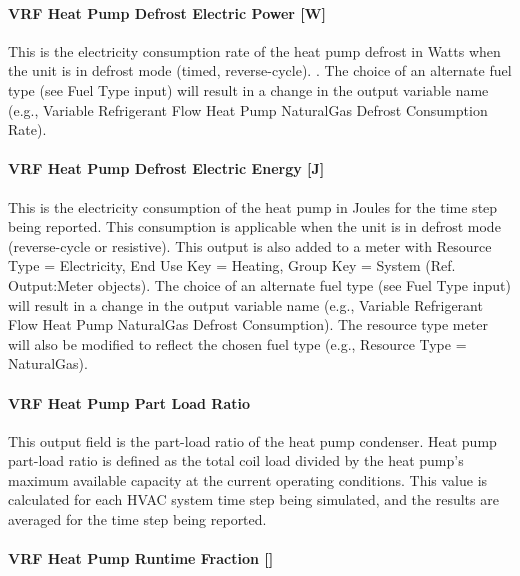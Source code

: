\paragraph{VRF Heat Pump Defrost Electric Power {[}W{]}}\label{vrf-heat-pump-defrost-electric-power-w}

This is the electricity consumption rate of the heat pump defrost in Watts when the unit is in defrost mode (timed, reverse-cycle). . The choice of an alternate fuel type (see Fuel Type input) will result in a change in the output variable name (e.g., Variable Refrigerant Flow Heat Pump NaturalGas Defrost Consumption Rate).

\paragraph{VRF Heat Pump Defrost Electric Energy {[}J{]}}\label{vrf-heat-pump-defrost-electric-energy-j}

This is the electricity consumption of the heat pump in Joules for the time step being reported. This consumption is applicable when the unit is in defrost mode (reverse-cycle or resistive). This output is also added to a meter with Resource Type = Electricity, End Use Key = Heating, Group Key = System (Ref. Output:Meter objects). The choice of an alternate fuel type (see Fuel Type input) will result in a change in the output variable name (e.g., Variable Refrigerant Flow Heat Pump NaturalGas Defrost Consumption). The resource type meter will also be modified to reflect the chosen fuel type (e.g., Resource Type = NaturalGas).

\paragraph{VRF Heat Pump Part Load Ratio}\label{vrf-heat-pump-part-load-ratio}

This output field is the part-load ratio of the heat pump condenser. Heat pump part-load ratio is defined as the total coil load divided by the heat pump's maximum available capacity at the current operating conditions. This value is calculated for each HVAC system time step being simulated, and the results are averaged for the time step being reported.

\paragraph{\texorpdfstring{VRF Heat Pump Runtime Fraction {[]}}{VRF Heat Pump Runtime Fraction }}\label{vrf-heat-pump-runtime-fraction}

